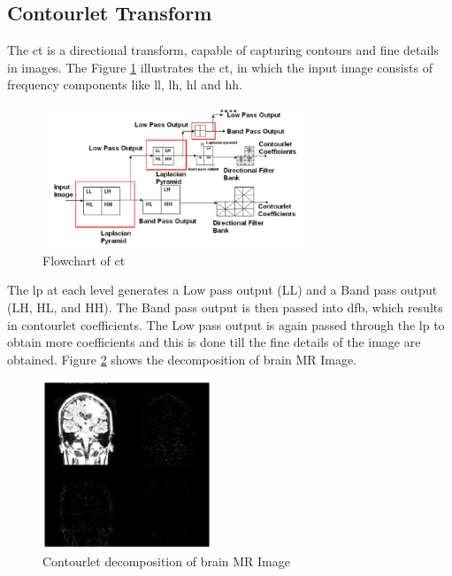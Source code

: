 \subsection{Contourlet Transform}

The \gls{ct} is a directional transform, capable of capturing contours and fine details in images. The Figure \ref{fig:contourlet_2} illustrates the \gls{ct}, in which the input image consists of frequency components like \gls{ll}, \gls{lh}, \gls{hl} and \gls{hh}. 

\begin{figure}[H]
	\centering
	\includegraphics[width=0.7\textwidth]{fig/contourlet_2}
	\caption{Flowchart of \glsdesc{ct}}
	\label{fig:contourlet_2}
\end{figure}

The \gls{lp} at each level generates a Low pass output (LL) and a Band pass output (LH, HL, and HH). The Band pass output is then passed into \gls{dfb}, which
results in contourlet coefficients. The Low pass output is again passed through the \gls{lp} to obtain more coefficients and this is done till the fine details of the image are obtained. Figure \ref{fig:contourlet_mr} shows the decomposition of brain MR Image. 

\begin{figure}[H]
	\centering
	\includegraphics[width=0.45\textwidth]{fig/contourlet_mr}
	\caption{Contourlet decomposition of brain MR Image}
	\label{fig:contourlet_mr}
\end{figure}



